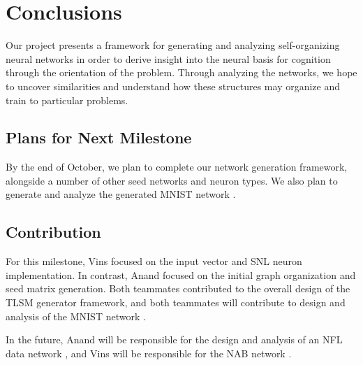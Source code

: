 \section{Conclusions} \label{sec:Conclusions}

Our project presents a framework for generating and analyzing self-organizing
neural networks in order to derive insight into the neural basis for cognition
through the orientation of the problem. Through analyzing the networks, we hope
to uncover similarities and understand how these structures may organize and
train to particular problems.

\subsection{Plans for Next Milestone}

By the end of October, we plan to complete our network generation framework,
alongside a number of other seed networks and neuron types. We also plan to
generate and analyze the generated MNIST network \cite{MNIST Dataset}.

\subsection{Contribution}

For this milestone, Vins focused on the input vector and SNL neuron
implementation. In contrast, Anand focused on the initial graph organization and
seed matrix generation. Both teammates contributed to the overall design of the
TLSM generator framework, and both teammates will contribute to design and
analysis of the MNIST network \cite{MNIST Dataset}.

In the future, Anand will be responsible for the design and analysis of an NFL
data network \cite{NFL Dataset}, and Vins will be responsible for the NAB
network \cite{NAB Dataset}.